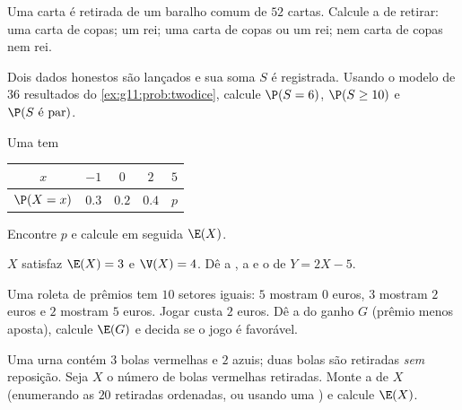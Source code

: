 \begin{exercise}[$\star$]\label{exo:g11:prob:1}
Uma carta é retirada de um baralho comum de $52$ cartas. Calcule a
 de retirar: uma carta de copas; um rei; uma carta de copas
ou um rei; nem carta de copas nem rei.
\end{exercise}

\begin{exercise}[$\star$]\label{exo:g11:prob:2}
Dois dados honestos são lançados e sua soma $S$ é registrada. Usando o
modelo de $36$ resultados do \cref{ex:g11:prob:twodice}, calcule
$\P(S = 6)$, $\P(S \geq 10)$ e $\P(S \text{ é par})$.
\end{exercise}

\begin{exercise}[$\star$]\label{exo:g11:prob:3}
Uma  tem 
\begin{center}
\begin{tabular}{c|cccc}
$x$ & $-1$ & $0$ & $2$ & $5$\\
\hline
$\P(X=x)$ & $0.3$ & $0.2$ & $0.4$ & $p$
\end{tabular}
\end{center}
Encontre $p$ e calcule em seguida $\E(X)$.
\end{exercise}

\begin{exercise}[$\star$]\label{exo:g11:prob:4}
$X$ satisfaz $\E(X) = 3$ e $\V(X) = 4$. Dê a , a  e o
 de $Y = 2X - 5$.
\end{exercise}

\begin{exercise}[$\star\star$]\label{exo:g11:prob:5}
Uma roleta de prêmios tem $10$ setores iguais: $5$ mostram $0$ euros, $3$
mostram $2$ euros e $2$ mostram $5$ euros. Jogar custa $2$ euros. Dê a
 do ganho $G$ (prêmio menos aposta), calcule $\E(G)$ e decida
se o jogo é favorável.
\end{exercise}

\begin{exercise}[$\star\star$]\label{exo:g11:prob:6}
Uma urna contém $3$ bolas vermelhas e $2$ azuis; duas bolas são retiradas
\emph{sem} reposição. Seja $X$ o número de bolas vermelhas retiradas.
Monte a  de $X$ (enumerando as $20$ retiradas ordenadas, ou
usando uma ) e calcule $\E(X)$.
\end{exercise}

